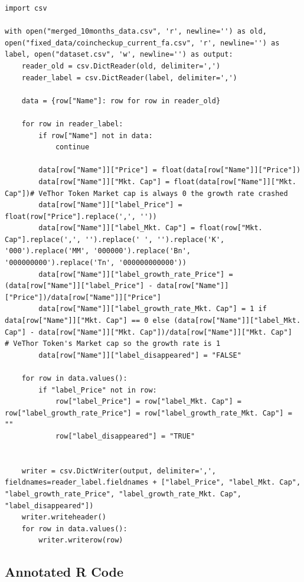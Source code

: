 \documentclass[11pt, english, letterpaper]{article}
\begin{document}
\begin{lstlisting}
import csv

with open("merged_10months_data.csv", 'r', newline='') as old, open("fixed_data/coincheckup_current_fa.csv", 'r', newline='') as label, open("dataset.csv", 'w', newline='') as output:
    reader_old = csv.DictReader(old, delimiter=',')
    reader_label = csv.DictReader(label, delimiter=',')

    data = {row["Name"]: row for row in reader_old}

    for row in reader_label:
        if row["Name"] not in data:
            continue

        data[row["Name"]]["Price"] = float(data[row["Name"]]["Price"])
        data[row["Name"]]["Mkt. Cap"] = float(data[row["Name"]]["Mkt. Cap"])# VeThor Token Market cap is always 0 the growth rate crashed
        data[row["Name"]]["label_Price"] = float(row["Price"].replace(',', ''))
        data[row["Name"]]["label_Mkt. Cap"] = float(row["Mkt. Cap"].replace(',', '').replace(' ', '').replace('K', '000').replace('MM', '000000').replace('Bn', '000000000').replace('Tn', '000000000000'))
        data[row["Name"]]["label_growth_rate_Price"] = (data[row["Name"]]["label_Price"] - data[row["Name"]]["Price"])/data[row["Name"]]["Price"]
        data[row["Name"]]["label_growth_rate_Mkt. Cap"] = 1 if data[row["Name"]]["Mkt. Cap"] == 0 else (data[row["Name"]]["label_Mkt. Cap"] - data[row["Name"]]["Mkt. Cap"])/data[row["Name"]]["Mkt. Cap"]  # VeThor Token's Market cap so the growth rate is 1
        data[row["Name"]]["label_disappeared"] = "FALSE"

    for row in data.values():
        if "label_Price" not in row:
            row["label_Price"] = row["label_Mkt. Cap"] = row["label_growth_rate_Price"] = row["label_growth_rate_Mkt. Cap"] = ""
            row["label_disappeared"] = "TRUE"


    writer = csv.DictWriter(output, delimiter=',', fieldnames=reader_label.fieldnames + ["label_Price", "label_Mkt. Cap", "label_growth_rate_Price", "label_growth_rate_Mkt. Cap", "label_disappeared"])
    writer.writeheader()
    for row in data.values():
        writer.writerow(row)
\end{lstlisting}

\subsection{Annotated R Code}
\end{document}
